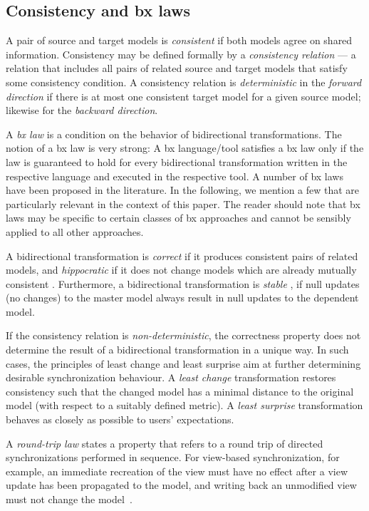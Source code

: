 \subsection{Consistency and bx laws}
\label{sec:Consistency}

A pair of source and target models is \emph{consistent} if both models agree on shared information. 
Consistency may be defined formally by a \emph{consistency relation} --- a relation that includes all pairs of related source and target models that satisfy some consistency condition. 
A consistency relation is \emph{deterministic} in the \emph{forward direction} if there is at most one consistent target model for a given source model; likewise for the \emph{backward direction}. 

A \emph{bx law} is a condition on the behavior of bidirectional transformations. 
The notion of a bx law is very strong: A bx language/tool satisfies a bx law only if the law is guaranteed to hold for every bidirectional transformation written in the respective language and executed in the respective tool. 
A number of bx laws have been proposed in the literature. 
In the following, we mention a few that are particularly relevant in the context of this paper. 
The reader should note that bx laws may be specific to certain classes of bx approaches and cannot be sensibly applied to all other approaches.

A bidirectional transformation is \emph{correct} if it produces consistent pairs of related models, and \emph{hippocratic} if it does not change models which are already mutually consistent \cite{SOSYM-Stevens2010}. Furthermore, a bidirectional transformation is \emph{stable} \cite{DBLP:journals/corr/PachecoMCV13}, if null updates (no changes) to the master model always result in null updates to the dependent model.
 
If the consistency relation is \emph{non-deter\-min\-is\-tic}, the correctness property does not determine the result of a bidirectional transformation in a unique way. 
In such cases, the principles of least change and least surprise aim at further determining desirable synchronization behaviour. 
A \emph{least change} transformation \cite{SOSYM-Macedo2016} restores consistency such that the changed model has a minimal distance to the original model (with respect to a suitably defined metric). 
A \emph{least surprise} transformation \cite{Cheney2015} behaves as closely as possible to users' expectations.

A \emph{round-trip law} states a property that refers to a round trip of directed synchronizations performed in sequence. 
For view-based synchronization, for example, an immediate recreation of the view must have no effect after a view update has been propagated to the model, and writing back an unmodified view must not change the model~\cite{TOPLAS2007-Foster}.

